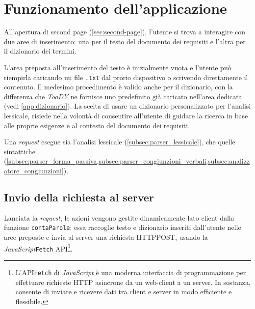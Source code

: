 \documentclass[12pt]{report}
\newcommand{\torevise}[1]{\textcolor{red}{#1}}
\newcommand{\toody}{\textsl{TooDY}\xspace}
\newcommand{\javascript}{\textsl{JavaScript}\xspace}
\newcommand{\api}{\textsf{API}\xspace}
\newcommand{\http}{\textsf{HTTP}\xspace}
\newcommand{\post}{\textsf{POST}\xspace}
\begin{document}
\section{Funzionamento dell'applicazione}
All'apertura di \textsf{second page} (\cref{sec:second-page}), l'utente si trova a interagire con due aree di inserimento: una per il testo del documento dei requisiti e l'altra per il dizionario dei termini.

L'area preposta all'inserimento del testo è inizialmente vuota e l'utente può riempirla caricando un file \texttt{.txt} dal prorio dispositivo o scrivendo direttamente il contenuto. Il medesimo procedimento è valido anche per il dizionario, con la differenza che \toody ne fornisce uno predefinito già caricato nell'area dedicata (vedi \cref{app:dizionario}). La scelta di usare un dizionario personalizzato per l'analisi lessicale, risiede nella volontà di consentire all'utente di guidare la ricerca in base alle proprie esigenze e al contesto del documento dei requisiti.

Una \textit{request} esegue sia l'analisi lessicale (\cref{subsec:parser_lessicale}), che quelle sintattiche (\cref{subsec:parser_forma_passiva,subsec:parser_congiunzioni_verbali,subsec:analizzatore_congiunzioni}).


\subsection{Invio della richiesta al server}
Lanciata la \textit{request}, le azioni vengono gestite dinamicamente lato client dalla funzione \texttt{contaParole}: essa raccoglie testo e dizionario inseriti dall'utente nelle aree preposte e invia al server una richiesta \http \post, usando la \javascript \texttt{Fetch} \api\footnote{L'\api \texttt{Fetch} di \javascript è una moderna interfaccia di programmazione per effettuare richieste \http asincrone da un web-client a un server. In sostanza, consente di inviare e ricevere dati tra client e server in modo efficiente e flessibile.}.
\end{document}
